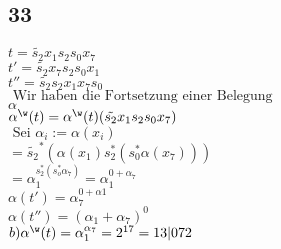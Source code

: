 \documentclass[11pt]{amsart}
\begin{document}
    \subsection*{33}
    
\(    t = \tilde{s_2}x_1s_2s_0x_7 \) \\
 \(   t' = \tilde{s_2}x_7s_2s_0x_1 \) \\
\(    t'' = \tilde{s_2}s_2x_1x_7s_0 \)\\
\(    \mbox{ Wir haben die Fortsetzung einer Belegung } \) \\
\(    \alpha \) \\
\(    \alpha^{\w}(t) = \alpha^{\w}(t)(\tilde{s_2}x_1s_2s_0x_7) \) \\
\(    \mbox{ Sei }\alpha_i := \alpha(x_i) \) \\
\(    = \tilde{s_2}^{*}(\alpha(x_1)s_2^*(s_0^*\alpha(x_7))) \) \\
\(    = \alpha_1^{s_2^*(s_o^*\alpha_7)}= \alpha_1^{0 + \alpha_7}  \) \\
\(    \alpha(t') = \alpha_7^{0+\alpha1}  \) \\
\(    \alpha(t'') = (\alpha_1 + \alpha_7)^0  \) \\
\(    b) \alpha^{\w}(t) = \alpha_1^{\alpha_7} = 2^{17} = 13|072  \) \\
\end{document}
